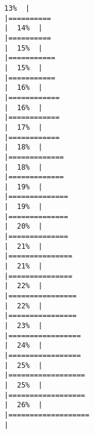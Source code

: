 \documentclass[
]{book}
\begin{document}
\begin{verbatim}
13%  |                                                                              |==========                                                            |  14%  |                                                                              |==========                                                            |  15%  |                                                                              |===========                                                           |  15%  |                                                                              |===========                                                           |  16%  |                                                                              |============                                                          |  16%  |                                                                              |============                                                          |  17%  |                                                                              |============                                                          |  18%  |                                                                              |=============                                                         |  18%  |                                                                              |=============                                                         |  19%  |                                                                              |==============                                                        |  19%  |                                                                              |==============                                                        |  20%  |                                                                              |==============                                                        |  21%  |                                                                              |===============                                                       |  21%  |                                                                              |===============                                                       |  22%  |                                                                              |================                                                      |  22%  |                                                                              |================                                                      |  23%  |                                                                              |=================                                                     |  24%  |                                                                              |=================                                                     |  25%  |                                                                              |==================                                                    |  25%  |                                                                              |==================                                                    |  26%  |                                                                              |===================                                                   |  
\end{verbatim}
\end{document}

